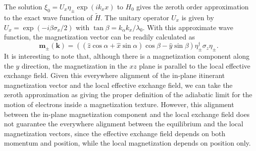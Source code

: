 \documentclass[12pt]{iopart}
\begin{document}
The solution $\xi_0 = U_x \eta_ \pm \exp {(i k_x x)}$ to $H_0$ gives the zeroth order approximation to the exact wave function of $\tilde {H}$. The unitary operator $U_x$ is given by $U_x = \exp {(-i \beta \sigma_x/2)}$ with $\tan \beta = k_ \alpha k_x / \lambda_0$. With this approximate wave function, the magnetization vector can be readily calculated as
\begin{equation}
\textbf{m}_\pm (\textbf{k}) = ( (\hat {z} \cos \alpha  + \hat {x} \sin \alpha) \cos \beta - \hat {y} \sin \beta) \eta^ \dagger _\pm \sigma_z \eta_ \pm.
\end{equation}
It is interesting to note that, although there is a magnetization component along the $y$ direction, the magnetization in the $xz$ plane is parallel to the local effective exchange field. Given this everywhere alignment of the in-plane itinerant magnetization vector and the local effective exchange field, we can take the zeroth approximation as giving the proper definition of the adiabatic limit for the motion of electrons inside a magnetization texture. However, this alignment between the in-plane magnetization component and the local exchange field does not guarantee the everywhere alignment between the equilibrium and the local magnetization vectors, since the effective exchange field depends on both momentum and position, while the local magnetization depends on position only.
\end{document}
